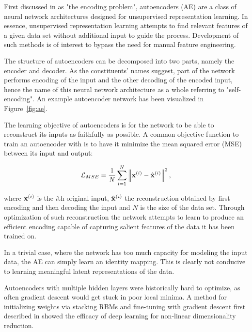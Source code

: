 First discussed in \cite{encoding_problem} as "the encoding problem", autoencoders (AE) are a class of neural network architectures designed for unsupervised representation learning. In essence, unsupervised representation learning attempts to find relevant features of a given data set without additional input to guide the process. Development of such methods is of interest to bypass the need for manual feature engineering.

The structure of autoencoders can be decomposed into two parts, namely the encoder and decoder. As the constituents' names suggest, part of the network performs encoding of the input and the other decoding of the encoded input, hence the name of this neural network architecture as a whole referring to "self-encoding". An example autoencoder network has been visualized in Figure~\ref{fig:ae}.

The learning objective of autoencoders is for the network to be able to reconstruct its inputs as faithfully as possible. A common objective function to train an autoencoder with is to have it minimize the mean squared error (MSE) between its input and output:

\begin{equation}
  \mathcal{L}_{MSE} = \frac{1}{N} \sum_{i=1}^{N} \left\lVert\mathbf{x}^{(i)} - \hat{\mathbf{x}}^{(i)}\right\rVert^2,
  \label{eq:mse}
\end{equation}

where $\mathbf{x}^{(i)}$ is the $i$th original input, $\hat{\mathbf{x}}^{(i)}$ the reconstruction obtained by first encoding and then decoding the input and $N$ is the size of the data set. Through optimization of such reconstruction the network attempts to learn to produce an efficient encoding capable of capturing salient features of the data it has been trained on.

In a trivial case, where the network has too much capacity for modeling the input data, the AE can simply learn an identity mapping. This is clearly not conducive to learning meaningful latent representations of the data.


Autoencoders with multiple hidden layers were historically hard to optimize, as often gradient descent would get stuck in poor local minima. A method for initializing weights via stacking RBMs and fine-tuning with gradient descent first described in \cite{hinton_autoencoder} showed the efficacy of deep learning for non-linear dimensionality reduction.

